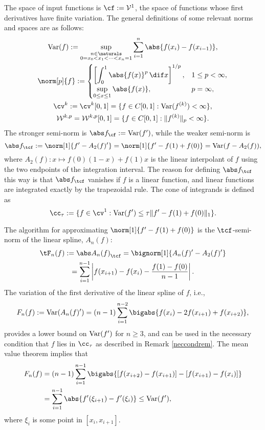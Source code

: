 The space of input functions is $\cf:=\mathcal{V}^{1}$, the space of functions whose first derivatives have finite variation.  The general definitions of some relevant norms and spaces are as follows:
\begin{subequations} \label{defSobolev}
\begin{gather}
\Var(f) := \sup_{\substack{n \in \naturals\\ 0 = x_0 < x_1 < \cdots < x_{n} =1}} \sum_{i=1}^n \abs{f(x_i)-f(x_{i-1})}, \\
\norm[p]{f}:= \begin{cases} \displaystyle \left[\int_0^1 \abs{f(x)}^p \, \dif x \right]^{1/p}, & 1 \le p < \infty,\\[1ex]
\displaystyle  \sup_{0 \le x \le 1} \abs{f(x)}, & p=\infty,
\end{cases}
\\
\cv^{k}: =\cv^{k}[0,1]=\{f\in C[0,1]: \Var(f^{(k)}) < \infty \}, \\
\mathcal{W}^{k,p}=\mathcal{W}^{k,p}[0,1]=\{f\in C[0,1]: \|f^{(k)}\|_{p}<\infty\}.
\end{gather}
\end{subequations}
The stronger semi-norm is $\Fnorm{f}:=\Var(f')$, while the weaker semi-norm is
\[
\Ftnorm{f}:=\norm[1]{f'-A_2(f)'}=\norm[1]{f'-f(1)+f(0)}=\Var(f-A_2(f)),
\]
where $A_2(f): x \mapsto f(0)(1-x)+f(1)x$ is the linear interpolant of $f$ using the two endpoints of the integration interval. The reason for defining $\Ftnorm{f}$ this way is that $\Ftnorm{f}$ vanishes if $f$ is a linear function, and linear functions are integrated exactly by the trapezoidal rule.  The cone of integrands is defined as
\begin{equation}\label{coneinteg}
\cc_{\tau}:=\{f\in \cv^{1}:\Var(f')\leq\tau\|f'-f(1)+f(0)\|_1\}.
\end{equation}

The algorithm for approximating $\norm[1]{f'-f(1)+f(0)}$ is the $\tcf$-semi-norm of the linear spline, $A_n(f)$:
\begin{multline}\label{1direst}
    \tF_n(f):=\Ftnorm{A_n(f)}=\bignorm[1]{A_n(f)'-A_2(f)'} \\
    =\sum_{i=1}^{n-1}\left|f(x_{i+1})-f(x_{i}) - \frac{f(1)-f(0)}{n-1}\right|.
\end{multline}
The variation of the first derivative of the linear spline of $f$, i.e.,
\begin{equation} \label{Fnormalg}
F_n(f) :=\Var(A_n(f)') = (n-1)\sum_{i=1}^{n-2} \bigabs{f(x_i) - 2 f(x_{i+1})+f(x_{i+2})},
\end{equation}
provides a lower bound on $\operatorname{Var}(f')$ for $n \ge 3$, and can be used in the necessary condition that $f$ lies in $\cc_\tau$ as described in Remark \ref{neccondrem}.
The mean value theorem implies that
\begin{align*}
F_n(f) &= (n-1)\sum_{i=1}^{n-1} \bigabs{[f(x_{i+2}) - f(x_{i+1})] - [f(x_{i+1}) - f(x_{i})]} \\
&= \sum_{i=1}^{n-1} \abs{f'(\xi_{i+1}) - f'(\xi_{i})} \le \Var(f'),
\end{align*}
where $\xi_i$ is some point in $[x_i,x_{i+1}]$.


